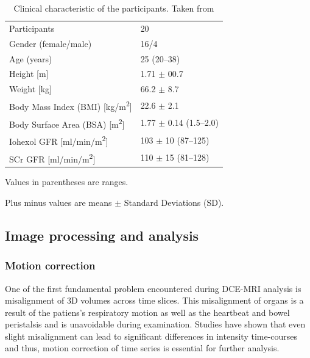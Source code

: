 \begin{table}[h!]
\centering
\caption[Clinical characteristic of the participants]{Clinical characteristic of the participants. Taken from \cite{eikefjord2017dynamic}}
\label{tab:participants}
\begin{threeparttable}
\renewcommand{\arraystretch}{1.25}
\begin{tabular}{m{7cm} m{4cm}}
	\hline

 	Participants & 20\\
  	Gender (female/male) &16/4\\
  	Age (years) & 25 (20--38)\\
  	Height [m] & 1.71 $\pm$ 00.7\\
  	Weight [kg] & 66.2 $\pm$ 8.7\\
  	Body Mass Index (BMI) [kg/m\textsuperscript{2}] & 22.6 $\pm$ 2.1\\
  	Body Surface Area (BSA) [m\textsuperscript{2}]& 1.77 $\pm$ 0.14 (1.5--2.0) \\
  	Iohexol GFR [ml/min/m\textsuperscript{2}] &103 $\pm$ 10 (87--125)\\
  	SCr GFR [ml/min/m\textsuperscript{2}] & 110 $\pm$ 15 (81--128)\\
  \hline

\end{tabular}
\begin{tablenotes}%
\footnotesize{}%
\item Values in parentheses are ranges.
\item Plus minus values are means $\pm$ Standard Deviations (SD).
    \end{tablenotes}
	\end{threeparttable}
\end{table}

\subsection{Image processing and analysis}

\subsubsection{Motion correction}
One of the first fundamental problem encountered during DCE-MRI analysis is misalignment of 3D volumes across time slices. This misalignment of organs is a result of the patiens's respiratory motion as well as the heartbeat and bowel peristalsis and is unavoidable during examination. Studies have shown that even slight misalignment can lead to significant differences in intensity time-courses \cite{KidneySubsegmentation} and thus, motion correction of time series is essential for further analysis.


